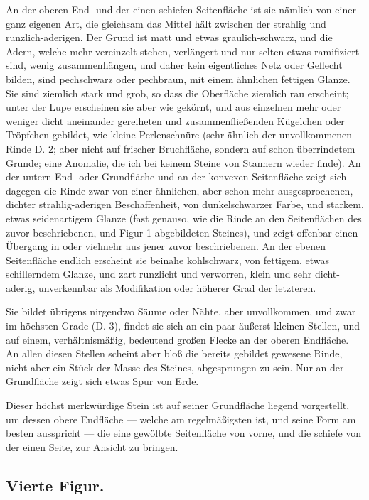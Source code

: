 \documentclass[a4paper, 11pt, oneside, german]{article}
\begin{document}
An der oberen End- und der einen schiefen Seitenfläche ist sie nämlich von einer ganz eigenen Art, die gleichsam das Mittel hält zwischen der strahlig und runzlich-aderigen. Der Grund ist matt und etwas graulich-schwarz, und die Adern, welche mehr vereinzelt stehen, verlängert und nur selten etwas ramifiziert sind, wenig zusammenhängen, und daher kein eigentliches Netz oder Geflecht bilden, sind pechschwarz oder pechbraun, mit einem ähnlichen fettigen Glanze. Sie sind ziemlich stark und grob, so dass die Oberfläche ziemlich rau erscheint; unter der Lupe erscheinen sie aber wie gekörnt, und aus einzelnen mehr oder weniger dicht aneinander gereiheten und zusammenfließenden Kügelchen oder Tröpfchen gebildet, wie kleine Perlenschnüre (sehr ähnlich der unvollkommenen Rinde D. 2; aber nicht auf frischer Bruchfläche, sondern auf schon überrindetem Grunde; eine Anomalie, die ich bei keinem Steine von Stannern wieder finde). An der untern End- oder Grundfläche und an der konvexen Seitenfläche zeigt sich dagegen die Rinde zwar von einer ähnlichen, aber schon mehr ausgesprochenen, dichter strahlig-aderigen Beschaffenheit, von dunkelschwarzer Farbe, und starkem, etwas seidenartigem Glanze (fast genauso, wie die Rinde an den Seitenflächen des zuvor beschriebenen, und Figur 1 abgebildeten Steines), und zeigt offenbar einen Übergang in oder vielmehr aus jener zuvor beschriebenen. An der ebenen Seitenfläche endlich erscheint sie beinahe kohlschwarz, von fettigem, etwas schillerndem Glanze, und zart runzlicht und verworren, klein und sehr dicht-aderig, unverkennbar als Modifikation oder höherer Grad der letzteren.

Sie bildet übrigens nirgendwo Säume oder Nähte, aber unvollkommen, und zwar im höchsten Grade (D. 3), findet sie sich an ein paar äußerst kleinen Stellen, und auf einem, verhältnismäßig, bedeutend großen Flecke an der oberen Endfläche. An allen diesen Stellen scheint aber bloß die bereits gebildet gewesene Rinde, nicht aber ein Stück der Masse des Steines, abgesprungen zu sein. Nur an der Grundfläche zeigt sich etwas Spur von Erde.

Dieser höchst merkwürdige Stein ist auf seiner Grundfläche liegend vorgestellt, um dessen obere Endfläche --- welche am regelmäßigsten ist, und seine Form am besten ausspricht --- die eine gewölbte Seitenfläche von vorne, und die schiefe von der einen Seite, zur Ansicht zu bringen.

\subsection{Vierte Figur.}
\end{document}
